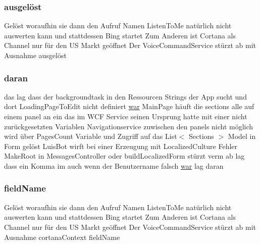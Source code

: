 \mbox{\label{_r_e_a_d_m_e_8txt_ae87c321689a82617b1f79b2274e0c802}} 
\subsubsection{\texorpdfstring{ausgelöst}{ausgelöst}}
{\footnotesize\ttfamily Gelöst woraufhin sie dann den Aufruf Namen Listen\+To\+Me natürlich nicht auswerten kann und stattdessen Bing startet Zum Anderen ist Cortana als Channel nur für den US Markt geöffnet Der Voice\+Command\+Service stürzt ab mit Ausnahme ausgelöst}

\mbox{\label{_r_e_a_d_m_e_8txt_a135543df2f8a787ac2ddeaf87194562c}} 
\subsubsection{\texorpdfstring{daran}{daran}}
{\footnotesize\ttfamily das lag dass der backgroundtask in den Ressourcen Strings der App sucht und dort Loading\+Page\+To\+Edit nicht definiert \mbox{\hyperlink{_r_e_a_d_m_e_8txt_a2a72fc7da943588cba8c302409b22e53}{war}} Main\+Page häuft die sections alle auf einem panel an ein das im W\+CF Service seinen Ursprung hatte mit einer nicht zurückgesetzten Variablen Navigationservice zuwischen den panels nicht möglich wird über Pages\+Count Variable und Zugriff auf das List$<$ Sections $>$ Model in Form gelöst Luis\+Bot wirft bei einer Erzeugung mit Localized\+Culture Fehler Make\+Root in Messages\+Controller oder build\+Localized\+Form stürzt verm ab lag dass ein Komma im auch wenn der Benutzername falsch \mbox{\hyperlink{_r_e_a_d_m_e_8txt_a2a72fc7da943588cba8c302409b22e53}{war}} lag daran}

\mbox{\label{_r_e_a_d_m_e_8txt_a225ecf32ab26301c2eb46c45696e77a2}} 
\subsubsection{\texorpdfstring{field\+Name}{fieldName}}
{\footnotesize\ttfamily Gelöst woraufhin sie dann den Aufruf Namen Listen\+To\+Me natürlich nicht auswerten kann und stattdessen Bing startet Zum Anderen ist Cortana als Channel nur für den US Markt geöffnet Der Voice\+Command\+Service stürzt ab mit Ausnahme cortana\+Context field\+Name}

